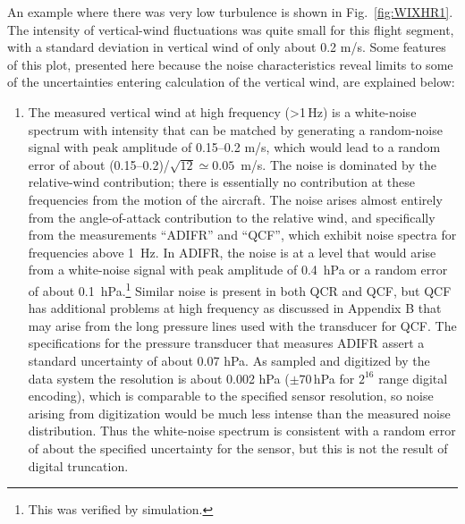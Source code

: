 \documentclass[12pt,twoside,english]{article}\usepackage[]{graphicx}\usepackage[]{color}
\let\OrgIndex\index
\renewcommand*{\index}[1]{\OrgIndex{#1}}
\begin{document}
An example where there was very low turbulence is shown in Fig.~\ref{fig:WIXHR1}. The intensity of vertical-wind fluctuations was quite small for this flight segment, with a standard deviation in vertical wind of only about 0.2 m/s. Some features of this plot, presented here because the noise characteristics reveal limits to some of the uncertainties entering calculation of the vertical wind, are explained below:  
\begin{enumerate}
\item The measured vertical wind at high frequency (>1\,Hz) is a white-noise spectrum with intensity that can be matched by generating a random-noise signal with peak amplitude of 0.15--0.2 m/s, which would lead to a random error of about (0.15--0.2)/$\sqrt{12}\simeq0.05$~m/s. The noise is dominated by the relative-wind contribution; there is essentially no contribution at these frequencies from the motion of the aircraft. The noise arises almost entirely from the angle-of-attack contribution to the relative wind, and specifically from the measurements ``ADIFR'' and ``QCF'', which exhibit noise spectra for frequencies above 1~Hz. In ADIFR, the noise is at a level that would arise from a white-noise signal with peak amplitude of 0.4~hPa or a random error of about 0.1~hPa.\footnote{This was verified by simulation.} \label{page:ADIFRnoise}Similar noise is present in both QCR and QCF, but QCF has additional problems at high frequency as discussed in Appendix B that may arise from the long pressure lines used with the transducer for QCF. The specifications for the pressure transducer that measures ADIFR assert a standard uncertainty of about 0.07 hPa. As sampled and digitized by the data system the resolution is about 0.002 hPa ($\pm70\,$hPa for $2^{16}$ range digital encoding), which is comparable to the specified sensor resolution, so noise arising from digitization would be much less intense than the measured noise distribution. Thus the white-noise spectrum is consistent with a random error of about the specified uncertainty for the sensor, but this is not the result of digital truncation. 


\end{enumerate}
\end{document}
